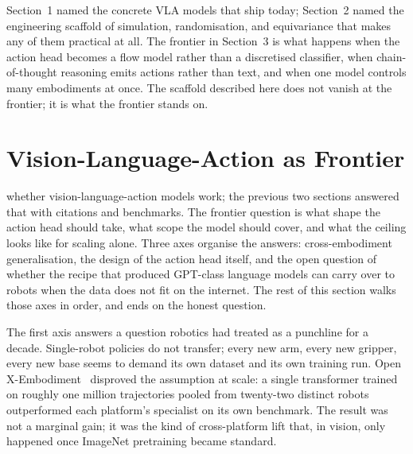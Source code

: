 \vspace{1.5em}

 Section~1 named the concrete VLA models that ship today; Section~2 named the engineering scaffold of simulation, randomisation, and equivariance that makes any of them practical at all. The frontier in Section~3 is what happens when the action head becomes a flow model rather than a discretised classifier, when chain-of-thought reasoning emits actions rather than text, and when one model controls many embodiments at once. The scaffold described here does not vanish at the frontier; it is what the frontier stands on.



\section{Vision-Language-Action as Frontier}


 whether vision-language-action models work; the previous two sections answered that with citations and benchmarks. The frontier question is what shape the action head should take, what scope the model should cover, and what the ceiling looks like for scaling alone. Three axes organise the answers: cross-embodiment generalisation, the design of the action head itself, and the open question of whether the recipe that produced GPT-class language models can carry over to robots when the data does not fit on the internet. The rest of this section walks those axes in order, and ends on the honest question.

\vspace{1.5em}

 The first axis answers a question robotics had treated as a punchline for a decade. Single-robot policies do not transfer; every new arm, every new gripper, every new base seems to demand its own dataset and its own training run. Open X-Embodiment~\cite{Padalkar2024OpenXEmbodiment} disproved the assumption at scale: a single transformer trained on roughly one million trajectories pooled from twenty-two distinct robots outperformed each platform's specialist on its own benchmark. The result was not a marginal gain; it was the kind of cross-platform lift that, in vision, only happened once ImageNet pretraining became standard.

